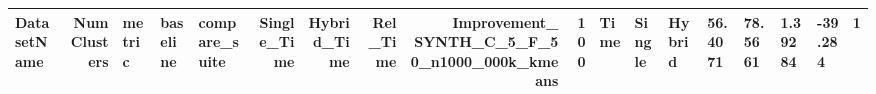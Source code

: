\begin{tabular}{lrlllrrrrr}
\toprule
DatasetName & NumClusters & metric & baseline & compare_suite & Single_Time & Hybrid_Time & Rel_Time & Improvement_%
\midrule
SYNTH_C_5_F_50_n1000_000k_kmeans & 100 & Time & Single & Hybrid & 56.4071 & 78.5661 & 1.39284 & -39.284 & 1 \\
\bottomrule
\end{tabular}

